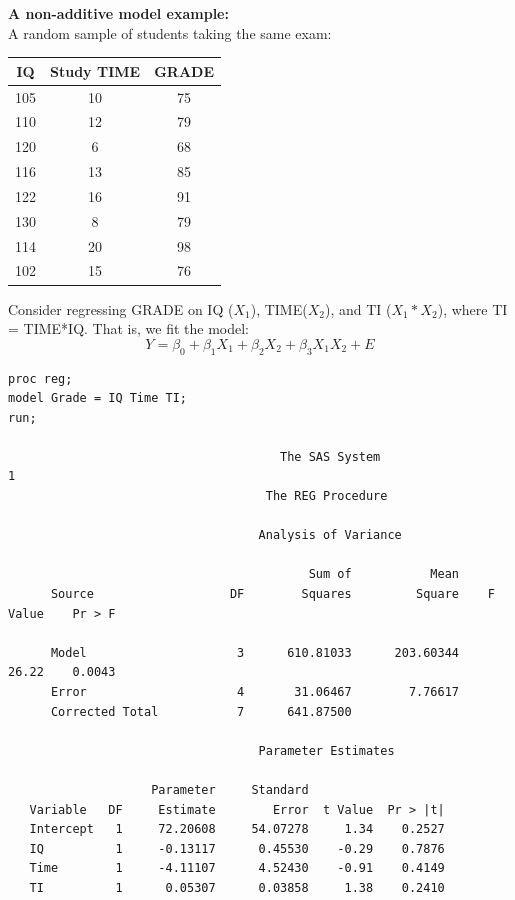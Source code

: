 \documentclass{article}
\begin{document}
\begin{center}
\end{center}

\newpage

\textbf{A non-additive model example:}\\
A random sample of students taking the same exam:
\begin{center}
\begin{tabular}{|c|c|c|} \hline
IQ & Study TIME & GRADE \\ \hline
105 & 10 & 75 \\
110 & 12 & 79 \\
120 & 6 & 68 \\
116 & 13 & 85 \\
122 & 16 & 91 \\
130 & 8 & 79 \\
114 & 20 & 98 \\
102 & 15 & 76 \\ \hline
\end{tabular}
\end{center}

Consider regressing GRADE on IQ ($X_1$), TIME($X_2$), and TI ($X_1*X_2$), where TI = TIME*IQ.  That is, we fit the model:
$$Y=\beta_0+\beta_1X_1 +\beta_2X_2+\beta_3X_1X_2+E$$
\begin{small}
\begin{verbatim}
proc reg;
model Grade = IQ Time TI;
run;

                                      The SAS System                                     1
                                    The REG Procedure

                                   Analysis of Variance
 
                                          Sum of           Mean
      Source                   DF        Squares         Square    F Value    Pr > F

      Model                     3      610.81033      203.60344      26.22    0.0043
      Error                     4       31.06467        7.76617                   
      Corrected Total           7      641.87500                                    

                                   Parameter Estimates
 
                    Parameter     Standard
   Variable   DF     Estimate        Error  t Value  Pr > |t|
   Intercept   1     72.20608     54.07278     1.34    0.2527
   IQ          1     -0.13117      0.45530    -0.29    0.7876
   Time        1     -4.11107      4.52430    -0.91    0.4149
   TI          1      0.05307      0.03858     1.38    0.2410 
\end{verbatim}
\end{small}
\end{document}
